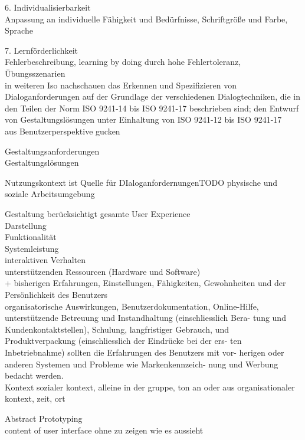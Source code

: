  6. Individualisierbarkeit\\
 	Anpassung an individuelle Fähigkeit und Bedürfnisse, Schriftgröße und Farbe, Sprache

 7. Lernförderlichkeit\\
 	Fehlerbeschreibung, learning by doing durch hohe Fehlertoleranz, Übungsszenarien\\

 	in weiteren Iso nachschauen
 	das Erkennen und Spezifizieren von Dialoganforderungen auf der Grundlage der verschiedenen Dialogtechniken, die in den Teilen der Norm ISO 9241-14 bis ISO 9241-17 beschrieben sind;
 den Entwurf von Gestaltungslösungen unter Einhaltung von ISO 9241-12 bis ISO 9241-17\\

 aus Benutzerperspektive gucken

 Gestaltungsanforderungen\\
 Gestaltungslösungen

 Nutzungskontext ist Quelle für DIaloganfordernungenTODO physische und soziale Arbeitsumgebung

 Gestaltung berücksichtigt gesamte User Experience\\
 Darstellung\\
 Funktionalität\\
 Systemleistung\\
 interaktiven Verhalten\\
 unterstützenden Ressourcen (Hardware und Software)\\
 + bisherigen Erfahrungen, Einstellungen, Fähigkeiten, Gewohnheiten und der Persönlichkeit des Benutzers\\

 organisatorische Auswirkungen, Benutzerdokumentation, Online-Hilfe, unterstützende Betreuung und Instandhaltung (einschliesslich Bera- tung und Kundenkontaktstellen), Schulung, langfristiger Gebrauch, und Produktverpackung (einschliesslich der Eindrücke bei der ers- ten Inbetriebnahme) sollten die Erfahrungen des Benutzers mit vor- herigen oder anderen Systemen und Probleme wie Markenkennzeich- nung und Werbung bedacht werden.\\

 Kontext sozialer kontext, alleine in der gruppe, ton an oder aus
 organisationaler kontext, zeit, ort

 Abstract Prototyping\\
 content of user interface ohne zu zeigen wie es aussieht\\

